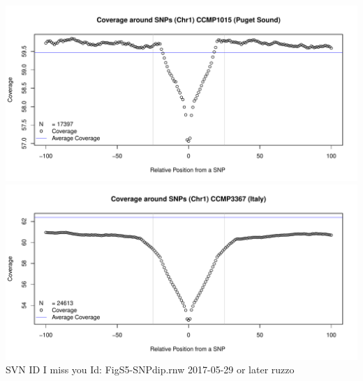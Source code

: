 \documentclass{article}\usepackage[]{graphicx}\usepackage[]{color}
\begin{document}
\includegraphics[width=\linewidth]{FigS5-SNPdip-figs/snpdip-chr1-1015.pdf}\\
\includegraphics[width=\linewidth]{FigS5-SNPdip-figs/snpdip-chr1-3367.pdf}\\


\vfill\footnotesize\flushright SVN ID I miss you $ $Id: FigS5-SNPdip.rnw 2017-05-29 or later ruzzo $ $
\end{document}
